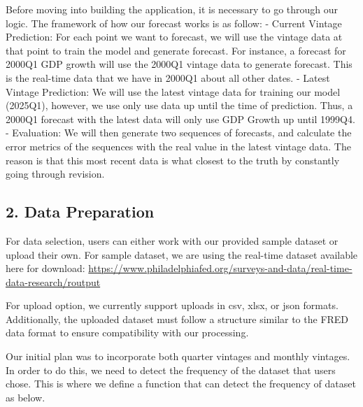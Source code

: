 \documentclass[
]{article}
\begin{document}
Before moving into building the application, it is necessary to go
through our logic. The framework of how our forecast works is as follow:
- Current Vintage Prediction: For each point we want to forecast, we
will use the vintage data at that point to train the model and generate
forecast. For instance, a forecast for 2000Q1 GDP growth will use the
2000Q1 vintage data to generate forecast. This is the real-time data
that we have in 2000Q1 about all other dates. - Latest Vintage
Prediction: We will use the latest vintage data for training our model
(2025Q1), however, we use only use data up until the time of prediction.
Thus, a 2000Q1 forecast with the latest data will only use GDP Growth up
until 1999Q4. - Evaluation: We will then generate two sequences of
forecasts, and calculate the error metrics of the sequences with the
real value in the latest vintage data. The reason is that this most
recent data is what closest to the truth by constantly going through
revision.

\hypertarget{data-preparation}{%
\subsection{2. Data Preparation}\label{data-preparation}}

For data selection, users can either work with our provided sample
dataset or upload their own. For sample dataset, we are using the
real-time dataset available here for download:
\url{https://www.philadelphiafed.org/surveys-and-data/real-time-data-research/routput}

For upload option, we currently support uploads in csv, xlsx, or json
formats. Additionally, the uploaded dataset must follow a structure
similar to the FRED data format to ensure compatibility with our
processing.

Our initial plan was to incorporate both quarter vintages and monthly
vintages. In order to do this, we need to detect the frequency of the
dataset that users chose. This is where we define a function that can
detect the frequency of dataset as below.
\end{document}
